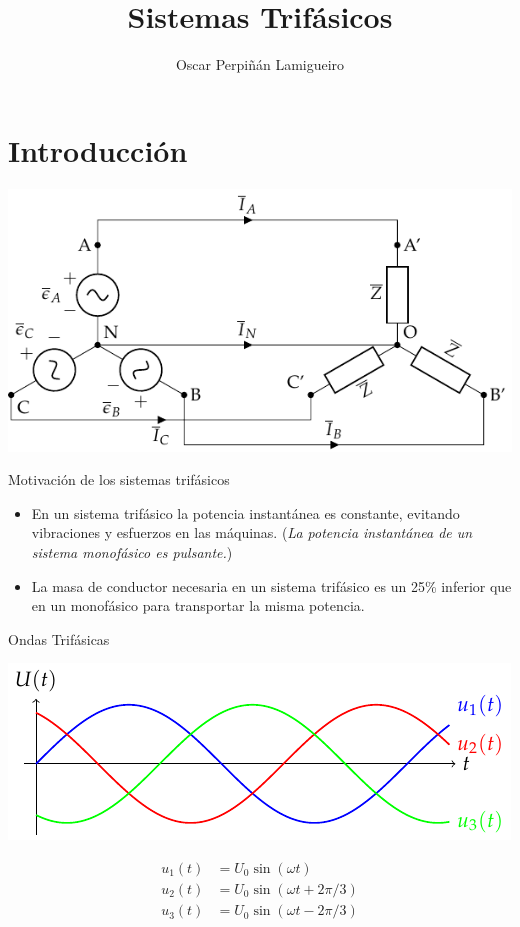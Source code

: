 \documentclass[aspectratio=169, usenames,svgnames,dvipsnames]{beamer}
\author{Oscar Perpiñán Lamigueiro}
\date{}
\title{Sistemas Trifásicos}
\begin{document}
\maketitle

\section{Introducción}
\label{sec:orgc62c084}

\begin{frame}[label={sec:org8f0bd71},plain]{}
\begin{center}
\includegraphics[width=.9\linewidth]{../figs/EstrellaEquilibrado.pdf}
\end{center}
\end{frame}

\begin{frame}[label={sec:org73812a0}]{Motivación de los sistemas trifásicos}
\begin{itemize}
\item En un sistema trifásico la potencia instantánea es constante, evitando vibraciones y esfuerzos en las máquinas. (\emph{La potencia instantánea de un sistema monofásico es pulsante.})

\item La masa de conductor necesaria en un sistema trifásico es un 25\% inferior que en un monofásico para transportar la misma potencia.
\end{itemize}
\end{frame}

\begin{frame}[label={sec:orge2f5002}]{Ondas Trifásicas}
\begin{center}
\includegraphics[width=.9\linewidth]{../figs/TensionesTrifasica.pdf}
\end{center}

\begin{align*}
  u_1(t) &= U_0 \sin(\omega t)\\
  u_2(t) &= U_0 \sin(\omega t + 2\pi/3)\\
  u_3(t) &= U_0 \sin(\omega t - 2\pi/3)
\end{align*}
\end{frame}
\end{document}

